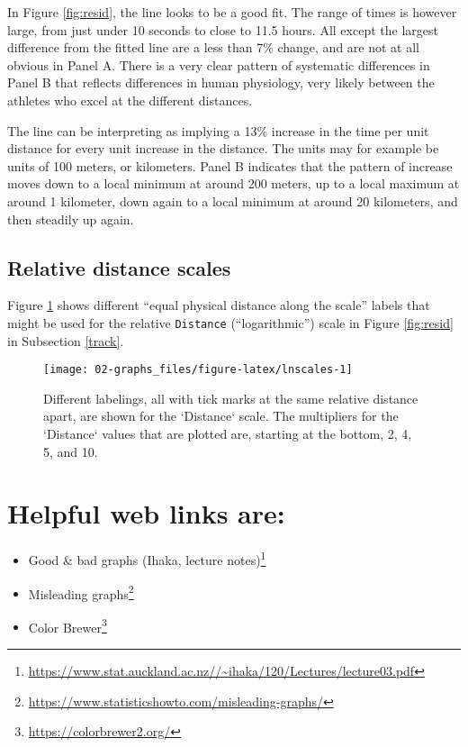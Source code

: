 \documentclass[
  10ptls,
  b5paper]{book}
\providecommand{\tightlist}{%
  \setlength{\itemsep}{0pt}\setlength{\parskip}{0pt}}
\begin{document}
In Figure \ref{fig:resid}, the line looks to be a good fit. The range of times is however large, from just under 10 seconds to close to 11.5 hours. All except the largest difference from the fitted line are a less than 7\% change, and are not at all obvious in Panel A. There is a very clear pattern of systematic differences in Panel B that reflects differences in human physiology, very likely between the athletes who excel at the different distances.

The line can be interpreting as implying a 13\% increase in the time per unit distance for every unit increase in the distance. The units may for example be units of 100 meters, or kilometers. Panel B indicates that the pattern of increase moves down to a local minimum at around 200 meters, up to a local maximum at around 1 kilometer, down again to a local minimum at around 20 kilometers, and then steadily up again.

\subsection*{Relative distance scales}\label{relative-distance-scales}

Figure \ref{fig:lnscales} shows different ``equal physical distance along the scale'' labels that might be used for the relative \texttt{Distance} (``logarithmic'') scale in Figure \ref{fig:resid} in Subsection \ref{track}.

\begin{figure}[H]

{\centering \texttt{[image: 02-graphs\_files/figure-latex/lnscales-1]} 

}

\caption{Different labelings, all with tick marks at the same
relative distance apart, are shown for the `Distance` scale.
The multipliers for the `Distance` values that are plotted are,
starting at the bottom, 2, 4, 5, and 10.}\label{fig:lnscales}
\end{figure}

\section{Helpful web links are:}\label{helpful-web-links-are}

\begin{itemize}
\tightlist
\item
  Good \& bad graphs (Ihaka, lecture notes)\footnote{\url{https://www.stat.auckland.ac.nz//~ihaka/120/Lectures/lecture03.pdf}}
\item
  Misleading graphs\footnote{\url{https://www.statisticshowto.com/misleading-graphs/}}
\item
  Color Brewer\footnote{\url{https://colorbrewer2.org/}}
\end{itemize}
\end{document}
